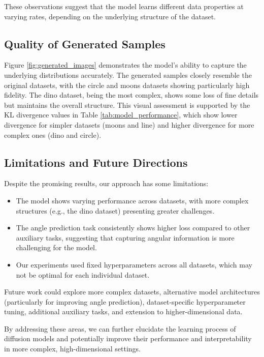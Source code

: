 \documentclass{article} %
\begin{document}
These observations suggest that the model learns different data properties at varying rates, depending on the underlying structure of the dataset.

\subsection{Quality of Generated Samples}

Figure \ref{fig:generated_images} demonstrates the model's ability to capture the underlying distributions accurately. The generated samples closely resemble the original datasets, with the circle and moons datasets showing particularly high fidelity. The dino dataset, being the most complex, shows some loss of fine details but maintains the overall structure. This visual assessment is supported by the KL divergence values in Table \ref{tab:model_performance}, which show lower divergence for simpler datasets (moons and line) and higher divergence for more complex ones (dino and circle).

\subsection{Limitations and Future Directions}

Despite the promising results, our approach has some limitations:

\begin{itemize}
    \item The model shows varying performance across datasets, with more complex structures (e.g., the dino dataset) presenting greater challenges.
    \item The angle prediction task consistently shows higher loss compared to other auxiliary tasks, suggesting that capturing angular information is more challenging for the model.
    \item Our experiments used fixed hyperparameters across all datasets, which may not be optimal for each individual dataset.
\end{itemize}

Future work could explore more complex datasets, alternative model architectures (particularly for improving angle prediction), dataset-specific hyperparameter tuning, additional auxiliary tasks, and extension to higher-dimensional data.

By addressing these areas, we can further elucidate the learning process of diffusion models and potentially improve their performance and interpretability in more complex, high-dimensional settings.
\end{document}
